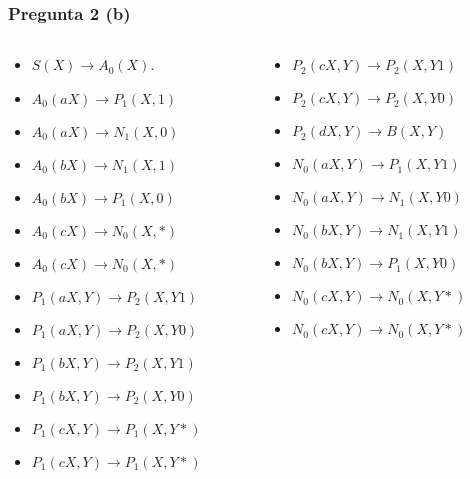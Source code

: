 \documentclass{beamer}
\begin{document}
\begin{frame}
    \frametitle{Pregunta 2 (b)}
    
    \begin{columns}
        \begin{column}{0.48\textwidth}
            \begin{itemize}
                \item $S(X)\to A_0(X)$.
                      
                \item $A_0(aX)\to P_1(X,1)$
                \item $A_0(aX)\to N_1(X,0)$
                \item $A_0(bX)\to N_1(X,1)$
                \item $A_0(bX)\to P_1(X,0)$
                \item $A_0(cX)\to N_0(X,*)$
                \item $A_0(cX)\to N_0(X,*)$
                      
                \item $P_1(aX,Y)\to P_2(X,Y1)$
                \item $P_1(aX,Y)\to P_2(X,Y0)$
                \item $P_1(bX,Y)\to P_2(X,Y1)$
                \item $P_1(bX,Y)\to P_2(X,Y0)$
                      
                \item $P_1(cX,Y)\to P_1(X,Y*)$
                \item $P_1(cX,Y)\to P_1(X,Y*)$
                      
            \end{itemize}
        \end{column}
        \begin{column}{0.48\textwidth}
            \begin{itemize}   
                \item $P_2(cX,Y)\to P_2(X,Y1)$
                \item $P_2(cX,Y)\to P_2(X,Y0)$
                \item $P_2(dX,Y)\to B(X,Y)$
                      
                \item $N_0(aX,Y)\to P_1(X,Y1)$
                \item $N_0(aX,Y)\to N_1(X,Y0)$
                \item $N_0(bX,Y)\to N_1(X,Y1)$
                \item $N_0(bX,Y)\to P_1(X,Y0)$
                \item $N_0(cX,Y)\to N_0(X,Y*)$
                \item $N_0(cX,Y)\to N_0(X,Y*)$
                      

\end{itemize}
\end{column}
\end{columns}
\end{frame}
\end{document}
